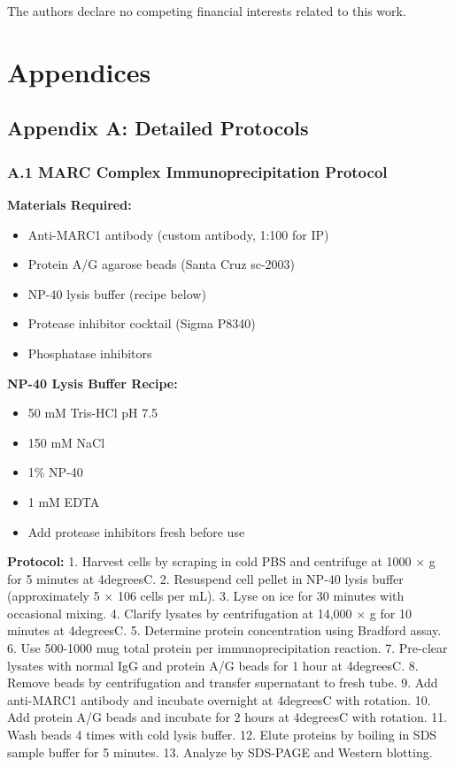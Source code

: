 \documentclass[11pt,a4paper]{article}
\begin{document}
The authors declare no competing financial interests related to this work.


\newpage

\section*{Appendices}

\subsection*{Appendix A: Detailed Protocols}

\subsubsection*{A.1 MARC Complex Immunoprecipitation Protocol}

\textbf{Materials Required:}
\begin{itemize}
\item Anti-MARC1 antibody (custom antibody, 1:100 for IP)
\item Protein A/G agarose beads (Santa Cruz sc-2003)
\item NP-40 lysis buffer (recipe below)
\item Protease inhibitor cocktail (Sigma P8340)
\item Phosphatase inhibitors
\end{itemize}

\textbf{NP-40 Lysis Buffer Recipe:}
\begin{itemize}
\item 50 mM Tris-HCl pH 7.5
\item 150 mM NaCl
\item 1\% NP-40
\item 1 mM EDTA
\item Add protease inhibitors fresh before use
\end{itemize}

\textbf{Protocol:}
1. Harvest cells by scraping in cold PBS and centrifuge at 1000 × g for 5 minutes at 4degreesC.
2. Resuspend cell pellet in NP-40 lysis buffer (approximately 5 × 106 cells per mL).
3. Lyse on ice for 30 minutes with occasional mixing.
4. Clarify lysates by centrifugation at 14,000 × g for 10 minutes at 4degreesC.
5. Determine protein concentration using Bradford assay.
6. Use 500-1000 mug total protein per immunoprecipitation reaction.
7. Pre-clear lysates with normal IgG and protein A/G beads for 1 hour at 4degreesC.
8. Remove beads by centrifugation and transfer supernatant to fresh tube.
9. Add anti-MARC1 antibody and incubate overnight at 4degreesC with rotation.
10. Add protein A/G beads and incubate for 2 hours at 4degreesC with rotation.
11. Wash beads 4 times with cold lysis buffer.
12. Elute proteins by boiling in SDS sample buffer for 5 minutes.
13. Analyze by SDS-PAGE and Western blotting.
\end{document}
